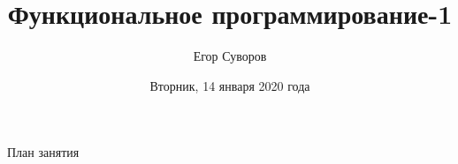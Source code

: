 \documentclass[utf8,xcolor=table]{beamer}
\title[ФП-1]{Функциональное программирование-1}
\author{Егор Суворов}
\institute[НИУ ВШЭ]{Курс <<Основы программирования>>}
\date[14.01.2020]{Вторник, 14 января 2020 года}
\begin{document}
\begin{frame}
\titlepage
\end{frame}

\begin{frame}{План занятия}
	\tableofcontents
\end{frame}










\end{document}
